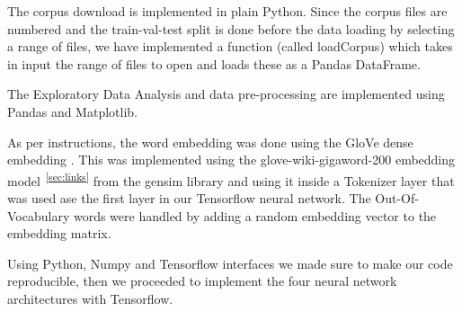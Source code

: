 \documentclass[11pt]{article}
\begin{document}

The corpus download is implemented in plain Python.
Since the corpus files are numbered and the train-val-test split is done before the data loading by selecting a range of files, we have implemented a function (called loadCorpus) which takes in input the range of files to open and loads these as a Pandas DataFrame.

The Exploratory Data Analysis and data pre-processing are implemented using Pandas and Matplotlib.

As per instructions, the word embedding was done using the GloVe dense embedding \cite{pennington-etal-2014-glove}.
This was implemented using the glove-wiki-gigaword-200 embedding model\textsuperscript{~\ref{sec:links}} from the gensim library \cite{rehurek_lrec} and using it inside a Tokenizer layer that was used ase the first layer in our Tensorflow neural network.
The Out-Of-Vocabulary words were handled by adding a random embedding vector to the embedding matrix.

Using Python, Numpy and Tensorflow interfaces we made sure to make our code reproducible, then we proceeded to implement the four neural network architectures with Tensorflow.

\end{document}
